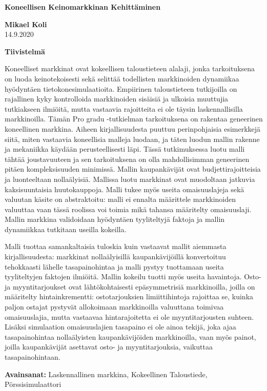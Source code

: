 

\thispagestyle{plain}
\begin{center}
    \Large
    \textbf{Koneellisen Keinomarkkinan Kehitt\"aminen}
        
    \vspace{0.4cm}
    \large
        
    \vspace{0.4cm}
    \textbf{Mikael Koli}\\
    14.9.2020 %
       
    \vspace{0.9cm}
    \textbf{Tiivistelmä}
\end{center}

Koneelliset markkinat ovat kokeellisen taloustieteen alalaji, jonka tarkoituksena
on luoda keinotekoisesti sekä selittää todellisten markkinoiden dynamiikaa hyödyntäen
tietokonesimulaatioita. Empiirinen taloustieteen tutkijoilla on rajallinen kyky kontrolloida
markkinoiden sisäisiä ja ulkoisia muuttujia tutkiakseen ilmiöitä, mutta vastaavia rajoitteita
ei ole täysin laskennallisilla markkinoilla. Tämän Pro gradu -tutkielman tarkoituksena on rakentaa
geneerinen koneellinen markkina. Aiheen kirjallisuudesta puuttuu perinpohjaisia esimerkkejä siitä,
miten vastaavia koneellisia malleja luodaan, ja täten luodun mallin rakenne ja mekaniikka käydään
perusteellisesti läpi. Tässä tutkimuksessa luotu malli tähtää joustavuuteen ja sen tarkoituksena on
olla mahdollisimman geneerinen pitäen kompleksisuuden minimissä. Mallin kaupankävijät ovat budjettirajoitteisia
ja luonteeltaan nollaälyisiä. Mallissa luotu markkinat ovat muodoltaan jatkuvia
kaksisuuntaisia huutokauppoja. Malli tukee myös useita omaisuuslajeja sekä valuutan käsite on abstraktoitu: 
malli ei ennalta määrittele markkinoiden valuuttaa vaan tässä roolissa voi toimia mikä tahansa määritelty
omaisuuslaji. Mallin markkina validoidaan hyödyntäen tyyliteltyjä faktoja ja mallin dynamiikkaa
tutkitaan useilla kokeilla.

Malli tuottaa samankaltaisia tuloskia kuin vastaavat mallit aiemmasta kirjallisuudesta: markkinat nollaälyisillä
kaupankävijöillä konvertoituu tehokkaasti lähelle tasapainohintaa ja malli pystyy tuottamaan useita tyyliteltyjen 
faktojen ilmiöitä. Mallin kokeilu tuotti myös useita havaintoja. Osto- ja myyntitarjoukset ovat lähtökohtaisesti 
epäsymmetrisiä markkinoilla, joilla on määritelty hintainkrementti: ostotarjouksien limiittihintoja rajoittaa 
se, kuinka paljon ostajat pystyvät allokoimaan markkinoilla valuuttana toimivaa omaisuuslajia, mutta vastaavaa 
hintarajoitetta ei ole myyntitarjousten suhteen. Lisäksi simulaation omaisuuslajien tasapaino ei ole ainoa tekijä,
joka ajaa tasapainohintaa nollaälyisten kaupankävijöiden markkinoilla, vaan myös painot, joilla kaupankävijät 
asettavat osto- ja myyntitarjouksia, vaikuttaa tasapainohintaan.

\textbf{Avainsanat:} Laskennallinen markkina, Kokeellinen Taloustiede, Pörssisimulaattori